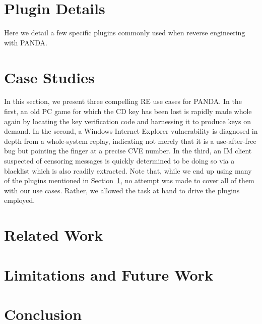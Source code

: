 \documentclass[conference]{IEEEtran}
\begin{document}
\section{Plugin Details}
\label{sec:plugins}

Here we detail a few specific plugins commonly used when reverse
engineering with PANDA.








\section{Case Studies}
\label{sec:usecases}

In this section, we present three compelling RE use cases for PANDA.
In the first, an old PC game for which the CD key has
been lost is rapidly made whole again by locating the key verification
code and harnessing it to produce keys on demand.  In the second, a
Windows Internet Explorer vulnerability is diagnosed in depth from a
whole-system replay, indicating not merely that it is a use-after-free
bug but pointing the finger at a precise CVE number.  In the third, an
IM client suspected of censoring messages is quickly
determined to be doing so via a blacklist which is also readily
extracted.  Note that, while we end up using many of the plugins
mentioned in Section~\ref{sec:plugins}, no attempt was made to cover
all of them with our use cases.  Rather, we allowed the task at hand
to drive the plugins employed.







\section{Related Work}
\label{sec:relwork}



\section{Limitations and Future Work}
\label{sec:future}


\section{Conclusion}




\end{document}
